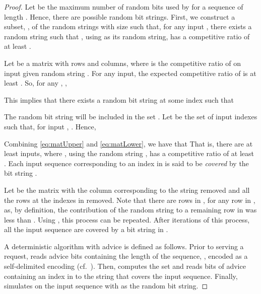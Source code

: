 \documentclass[a4paper]{article}
\begin{document}
\begin{proof}
  Let  be the maximum number of random bits used by  for a sequence of length . Hence, there are  possible random bit strings. First, we construct a subset, , of the  random strings with size  such that, for any input , there exists a random string  such that , using  as its random string, has a competitive ratio of at least .

Let  be a matrix with  rows and  columns, where  is the competitive ratio of  on input  given random string . For any input, the expected competitive ratio of  is at least . So, for any , ,

This implies that there exists a random bit string  at some index  such that

The random bit string  will be included in the set . Let  be the set of input indexes such that, for input , .  Hence,


Combining \eqref{eq:matUpper} and \eqref{eq:matLower}, we have that 
That is, there are at least  inputs, where , using the random string , has a competitive ratio of at least . Each input sequence corresponding to an index in  is said to be \emph{covered} by the bit string .

Let  be the matrix  with the column corresponding to the string  removed and all the rows at the indexes in  removed. Note that there are  rows in , for any row  in ,  as, by definition, the contribution of the random string  to a remaining row in  was less than . Using , this process can be repeated. After  iterations of this process, all the input sequence are covered by a bit string in .

A deterministic algorithm with advice  is defined as follows. Prior to serving a request,  reads  advice bits containing the length of the sequence, , encoded as a self-delimited encoding (cf.~\cite{BockKKR14}). Then,  computes the set  and reads  bits of advice containing an index in  to the string  that covers the input sequence. Finally,  simulates  on the input sequence with  as the random bit string.
\end{proof}
\end{document}
